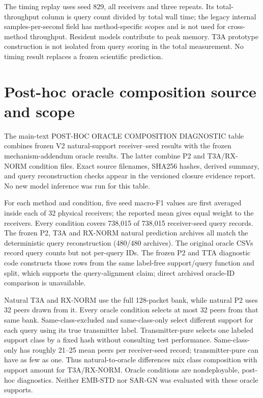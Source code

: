 \documentclass[11pt]{article}
\begin{document}
The timing replay uses seed 829, all receivers and three repeats. Its total-throughput column is query count divided by total wall time; the legacy internal samples-per-second field has method-specific scopes and is not used for cross-method throughput. Resident models contribute to peak memory. T3A prototype construction is not isolated from query scoring in the total measurement. No timing result replaces a frozen scientific prediction.

\section{Post-hoc oracle composition source and scope}
The main-text POST-HOC ORACLE COMPOSITION DIAGNOSTIC table combines frozen V2 natural-support receiver--seed results with the frozen mechanism-addendum oracle results. The latter combine P2 and T3A/RX-NORM condition files. Exact source filenames, SHA256 hashes, derived summary, and query reconstruction checks appear in the versioned closure evidence report. No new model inference was run for this table.

For each method and condition, five seed macro-F1 values are first averaged inside each of 32 physical receivers; the reported mean gives equal weight to the receivers. Every condition covers 738,015 of 738,015 receiver-seed query records. The frozen P2, T3A and RX-NORM natural prediction archives all match the deterministic query reconstruction (480/480 archives). The original oracle CSVs record query counts but not per-query IDs. The frozen P2 and TTA diagnostic code constructs those rows from the same label-free support/query function and split, which supports the query-alignment claim; direct archived oracle-ID comparison is unavailable.

Natural T3A and RX-NORM use the full 128-packet bank, while natural P2 uses 32 peers drawn from it. Every oracle condition selects at most 32 peers from that same bank. Same-class-excluded and same-class-only select different support for each query using its true transmitter label. Transmitter-pure selects one labeled support class by a fixed hash without consulting test performance. Same-class-only has roughly 21--25 mean peers per receiver-seed record; transmitter-pure can have as few as one. Thus natural-to-oracle differences mix class composition with support amount for T3A/RX-NORM. Oracle conditions are nondeployable, post-hoc diagnostics. Neither EMB-STD nor SAR-GN was evaluated with these oracle supports.
\end{document}
